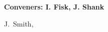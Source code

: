 

\begin{center}

\begin{large} {\bf Conveners: I. Fisk, J. Shank} \end{large}

J.~Smith, 

\end{center}

